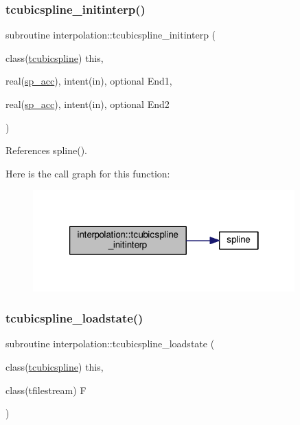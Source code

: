 \subsubsection{\texorpdfstring{tcubicspline\+\_\+initinterp()}{tcubicspline\_initinterp()}}
{\footnotesize\ttfamily subroutine interpolation\+::tcubicspline\+\_\+initinterp (\begin{DoxyParamCaption}\item[{class(\mbox{\hyperlink{structinterpolation_1_1tcubicspline}{tcubicspline}})}]{this,  }\item[{real(\mbox{\hyperlink{namespaceinterpolation_af72aa9a05feb8ef90b2d26e4a013abf3}{sp\+\_\+acc}}), intent(in), optional}]{End1,  }\item[{real(\mbox{\hyperlink{namespaceinterpolation_af72aa9a05feb8ef90b2d26e4a013abf3}{sp\+\_\+acc}}), intent(in), optional}]{End2 }\end{DoxyParamCaption})}



References spline().

Here is the call graph for this function\+:
\nopagebreak
\begin{figure}[H]
\begin{center}
\leavevmode
\includegraphics[width=286pt]{namespaceinterpolation_a141de3ad802bf42f3810c24e47e31310_cgraph}
\end{center}
\end{figure}
\mbox{\label{namespaceinterpolation_abaeaf4f39b2dbd78b28a5e1802475739}} 
\subsubsection{\texorpdfstring{tcubicspline\+\_\+loadstate()}{tcubicspline\_loadstate()}}
{\footnotesize\ttfamily subroutine interpolation\+::tcubicspline\+\_\+loadstate (\begin{DoxyParamCaption}\item[{class(\mbox{\hyperlink{structinterpolation_1_1tcubicspline}{tcubicspline}})}]{this,  }\item[{class(tfilestream)}]{F }\end{DoxyParamCaption})}



